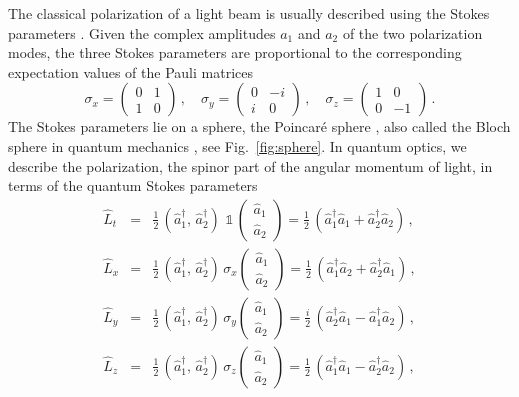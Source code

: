 \documentclass[12pt,amsmath,amssymb]{article}
\numberwithin{equation}{section}
\begin{document}
The classical polarization of a light beam is usually described
using the Stokes parameters \cite{BornWolf}. Given the complex
amplitudes $a_1$ and $a_2$ of the two polarization modes, the
three Stokes parameters are proportional to the corresponding
expectation values of the Pauli matrices
\begin{equation}
\label{eq:pauli}
\sigma_x = \left(
    \begin{array}{cc}
      0 & 1 \\
      1 & 0
    \end{array}
\right)\,,\quad\sigma_y = \left(
    \begin{array}{cc}
      0 & -i \\
      i & 0
    \end{array}
\right)\,,\quad\sigma_z = \left(
    \begin{array}{cc}
      1 & 0 \\
      0 & -1
    \end{array}
\right)\,.
\end{equation}
The Stokes parameters lie on a sphere, the Poincar\'e sphere
\cite{BornWolf}, also called the Bloch sphere in quantum
mechanics \cite{MandelWolf}, see Fig.\ \ref{fig:sphere}.
In quantum  optics, we describe the
polarization, the spinor part of the angular momentum of light,
in terms of the quantum Stokes parameters \cite{Korolkova}
\begin{eqnarray}
\hat{L}_t &=& \frac{1}{2}\, (\hat{a}_1^\dagger,\,
\hat{a}_2^\dagger)\,\, \mathds{1}\, \left(
    \begin{array}{c}
     \hat{a}_1  \\
     \hat{a}_2
    \end{array}
\right) = \frac{1}{2}\,\left(\hat{a}_1^\dagger\hat{a}_1 +
\hat{a}_2^\dagger\hat{a}_2\right)\,, \nonumber\\
\hat{L}_x &=& \frac{1}{2}\, (\hat{a}_1^\dagger,\,
\hat{a}_2^\dagger)\, \sigma_x \left(
    \begin{array}{c}
     \hat{a}_1  \\
     \hat{a}_2
    \end{array}
\right) = \frac{1}{2}\,\left(\hat{a}_1^\dagger\hat{a}_2 +
\hat{a}_2^\dagger\hat{a}_1\right)\,, \nonumber\\
\hat{L}_y &=& \frac{1}{2}\, (\hat{a}_1^\dagger,\,
\hat{a}_2^\dagger)\, \sigma_y \left(
    \begin{array}{c}
     \hat{a}_1  \\
     \hat{a}_2
    \end{array}
\right) = \frac{i}{2}\,\left(\hat{a}_2^\dagger\hat{a}_1 -
\hat{a}_1^\dagger\hat{a}_2\right)\,, \nonumber\\
\hat{L}_z &=& \frac{1}{2}\, (\hat{a}_1^\dagger,\,
\hat{a}_2^\dagger)\, \sigma_z \left(
    \begin{array}{c}
     \hat{a}_1  \\
     \hat{a}_2
    \end{array}
\right) = \frac{1}{2}\,\left(\hat{a}_1^\dagger\hat{a}_1 -
\hat{a}_2^\dagger\hat{a}_2\right)\,,
\label{eq:js}
\end{eqnarray}
\end{document}
